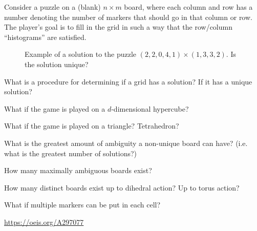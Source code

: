 \documentclass{article}
\begin{document}
Consider a puzzle on a (blank) $n \times m$ board, where each column and row
has a number denoting the number of markers that should go in that column or
row. The player's goal is to fill in the grid in such a way that the
row/column ``histograms'' are satisfied.
\begin{figure}[!h]
  \centering
  \caption{
    Example of a solution to the puzzle $(2, 2, 0, 4, 1) \times (1, 3, 3, 2)$.
    Is the solution unique?
  }
\end{figure}
\begin{question}
  What is a procedure for determining if a grid has a solution? If it has a
  unique solution?
\end{question}
\begin{related}
  \item What if the game is played on a $d$-dimensional hypercube?
  \item What if the game is played on a triangle? Tetrahedron?
  \item What is the greatest amount of ambiguity a non-unique board can have?
    (i.e. what is the greatest number of solutions?)
  \item How many maximally ambiguous boards exist?
  \item How many distinct boards exist up to dihedral action?
    Up to torus action?
  \item What if multiple markers can be put in each cell?
\end{related}
\begin{references}
  \item \url{https://oeis.org/A297077}
\end{references}
\end{document}
